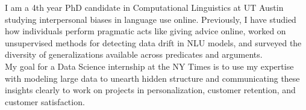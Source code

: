 I am a 4th year PhD candidate in Computational Linguistics at UT Austin studying interpersonal biases in language use online. Previously, I have studied how individuals perform pragmatic acts like giving advice online, worked on unsupervised methods for detecting data drift in NLU models, and surveyed the diversity of generalizations available across predicates and arguments.\\
My goal for a Data Science internship at the NY Times is to use my expertise with modeling large data to unearth hidden structure and communicating these insights clearly to work on projects in personalization, customer retention, and customer satisfaction.
